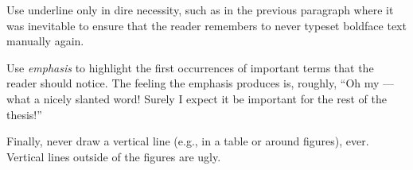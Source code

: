 Use underline only in dire necessity, such as in the previous paragraph where it was inevitable to ensure that the reader remembers to never typeset boldface text manually again.

Use \emph{emphasis} to highlight the first occurrences of important terms that the reader should notice. The feeling the emphasis produces is, roughly, ``Oh my --- what a nicely slanted word! Surely I expect it be important for the rest of the thesis!''

Finally, never draw a vertical line (e.g., in a table or around figures), ever. Vertical lines outside of the figures are ugly.
\fi
